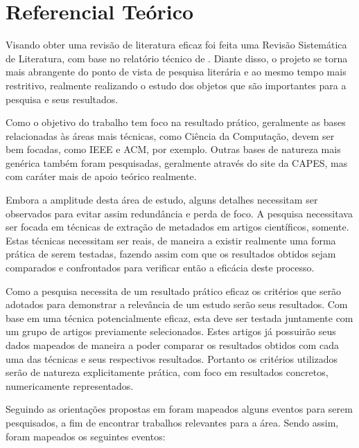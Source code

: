 \chapter{Referencial Teórico}


Visando obter uma revisão de literatura eficaz foi feita uma Revisão Sistemática de Literatura, com base no relatório técnico de \cite{Kitchenham}. Diante disso, o projeto se torna mais abrangente do ponto de vista de pesquisa literária e ao mesmo tempo mais restritivo, realmente realizando o estudo dos objetos que são importantes para a pesquisa e seus resultados.


Como o objetivo do trabalho tem foco na resultado prático, geralmente as bases relacionadas às áreas mais técnicas, como Ciência da Computação, devem ser bem focadas, como IEEE e ACM, por exemplo. Outras bases de natureza mais genérica também foram pesquisadas, geralmente através do site da CAPES, mas com caráter mais de apoio teórico realmente.

Embora a amplitude desta área de estudo, alguns detalhes necessitam ser observados para evitar assim redundância e perda de foco. A pesquisa necessitava ser focada em técnicas de extração de metadados em artigos científicos, somente. Estas técnicas necessitam ser reais, de maneira a existir realmente uma forma prática de serem testadas, fazendo assim com que os resultados obtidos sejam comparados e confrontados para verificar então a eficácia deste processo.

Como a pesquisa necessita de um resultado prático eficaz os critérios que serão adotados para demonstrar a relevância de um estudo serão seus resultados. Com base em uma técnica potencialmente eficaz, esta deve ser testada juntamente com um grupo de artigos previamente selecionados. Estes artigos já possuirão seus dados mapeados de maneira a poder comparar os resultados obtidos com cada uma das técnicas e seus respectivos resultados. Portanto os critérios utilizados serão de natureza explicitamente prática, com foco em resultados concretos, numericamente representados.


Seguindo as orientações propostas em \cite{Kitchenham} foram mapeados alguns eventos para serem pesquisados, a fim de encontrar trabalhos relevantes para a área. Sendo assim, foram mapeados os seguintes eventos:


